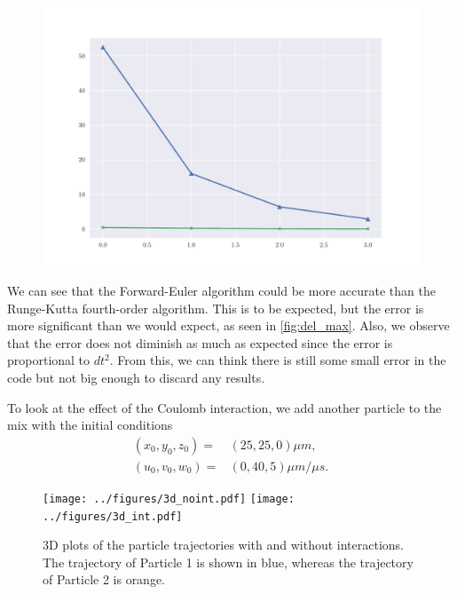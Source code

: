 \begin{figure}
\centering
\includegraphics[scale = 1]{../figures/del_max.pdf}
\caption{}
\label{fig:del_max}
\end{figure}

We can see that the Forward-Euler algorithm could be more accurate than the Runge-Kutta fourth-order algorithm. This is to be
expected, but the error is more significant than we would expect, as seen in \autoref{fig:del_max}. Also, we observe that the error does not diminish 
as much as expected since the error is proportional to $dt^2$. From this, we can think there is still some small error in the code but
not big enough to discard any results. 




To look at the effect of the Coulomb interaction, we add another particle to the mix with the initial
conditions
\begin{align}
  (x_0, y_0, z_0) =& (25, 25, 0)\mu m, \\
  (u_0, v_0, w_0) =& (0, 40, 5) \mu m / \mu s.
\end{align}

\begin{figure}
\centering
\texttt{[image: ../figures/3d\_noint.pdf]}
\texttt{[image: ../figures/3d\_int.pdf]}
\caption{3D plots of the particle trajectories with and without interactions. The trajectory of Particle 1 is shown in blue, whereas the trajectory of Particle 2 is orange. }
\label{fig:3d}
\end{figure}

